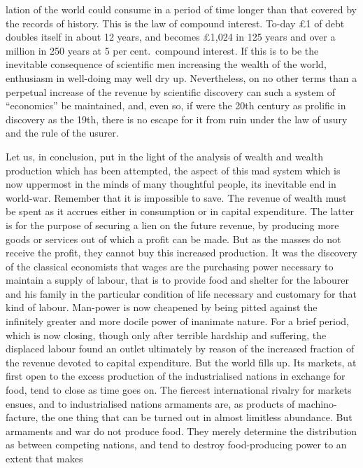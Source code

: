 \documentclass[10.5pt,twoside]{book}
\newcommand{\origpage}[1]{\clearpage\setcounter{page}{#1}}
\begin{document}
\origpage{31}

\noindent lation of the world could consume in a period of time longer than
that covered by the records of history. This is the law of compound interest.
To-day \pounds1 of debt doubles itself in about 12 years,
and becomes \pounds1,024 in 125 years and over a million in 250 years at
5 per cent.\ compound interest. If this is to be the
inevitable consequence of scientific men increasing the wealth of the world,
enthusiasm in well-doing may well dry up. Nevertheless, on no other terms than
a perpetual increase of the revenue by scientific discovery can such a system
of ``economics'' be maintained, and, even so, if were the 20th century as
prolific in discovery as the 19th, there is no escape for it from ruin under
the law of usury and the rule of the usurer.

Let us, in conclusion, put in the light of the analysis of wealth and wealth
production which has been attempted, the aspect of this mad system which is
now uppermost in the minds of many thoughtful people, its inevitable end in
world-war. Remember that it is impossible to save. The revenue of wealth must
be spent as it accrues either in consumption or in capital expenditure. The
latter is for the purpose of securing a lien on the future revenue, by
producing more goods or services out of which a profit can be made. But as the
masses do not receive the profit, they cannot buy this increased production.
It was the discovery of the classical economists that wages are the purchasing
power necessary to maintain a supply of labour, that is to provide food and
shelter for the labourer and his family in the particular condition of life
necessary and customary for that kind of labour. Man-power is now cheapened by
being pitted against the infinitely greater and more docile power of inanimate
nature. For a brief period, which is now closing, though only after terrible
hardship and suffering, the displaced labour found an outlet ultimately by
reason of the increased fraction of the revenue devoted to capital
expenditure. But the world fills up. Its markets, at first open to the excess
production of the industrialised nations in exchange for food, tend to close
as time goes on. The fiercest international rivalry for markets ensues, and to
industrialised nations armaments are, as products of machino-facture, the one
thing that can be turned out in almost limitless abundance. But armaments and
war do not produce food. They merely determine the distribution as between
competing nations, and tend to destroy food-producing power to an extent that
makes
\end{document}

